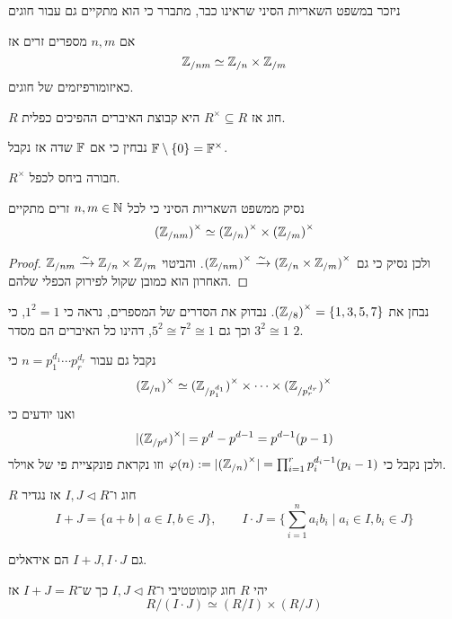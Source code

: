 ניזכר במשפט השאריות הסיני שראינו כבר, מתברר כי הוא מתקיים גם עבור חוגים
\begin{theorem}
	אם $n, m$ מספרים זרים אז
	\[
		\mathbb{Z}_{/nm} \simeq \mathbb{Z}_{/n} \times \mathbb{Z}_{/m}
	\]
	כאיזומורפיזמים של חוגים.
\end{theorem}
\begin{definition}
	$R$ חוג אז $R^\times \subseteq R$ היא קבוצת האיברים ההפיכים כפלית.
\end{definition}
נבחין כי אם $\mathbb{F}$ שדה אז נקבל $\mathbb{F} \setminus \{ 0 \} = \mathbb{F}^\times$.
\begin{proposition}
	$R^\times$ חבורה ביחס לכפל.
\end{proposition}
\begin{conclusion}
	נסיק ממשפט השאריות הסיני כי לכל $n, m \in \mathbb{N}$ זרים מתקיים
	\[
		{(\mathbb{Z}_{/nm})}^\times \simeq {(\mathbb{Z}_{/n})}^\times \times {(\mathbb{Z}_{/m})}^\times
	\]
\end{conclusion}
\begin{proof}
	$\mathbb{Z}_{/nm} \xrightarrow{\sim} \mathbb{Z}_{/n} \times \mathbb{Z}_{/m}$
	ולכן נסיק כי גם ${(\mathbb{Z}_{/nm})}^\times \xrightarrow{\sim} {(\mathbb{Z}_{/n} \times \mathbb{Z}_{/m})}^\times$.
	והביטוי האחרון הוא כמובן שקול לפירוק הכפלי שלהם.
\end{proof}
\begin{example}
	נבחן את ${(\mathbb{Z}_{/8})}^\times = \{ 1, 3, 5, 7 \}$.
	נבדוק את הסדרים של המספרים, נראה כי $1^2 = 1$, כי $3^2 \cong 1$ וכך גם $5^2 \cong 7^2 \cong 1$, דהינו כל האיברים הם מסדר $2$.
\end{example}
\begin{example}
	נקבל גם עבור $n = p_1^{d_1} \cdots p_r^{d_r}$ כי
	\[
		{(\mathbb{Z}_{/n})}^\times \simeq {(\mathbb{Z}_{/p_1^{d_1}})}^\times \times \cdots \times {(\mathbb{Z}_{/p_r^{d_r}})}^\times 
	\]
	ואנו יודעים כי
	\[
		|{(\mathbb{Z}_{/p^{d}})}^\times| = p^d - p^{d - 1} = p^{d - 1}(p - 1)
	\]
	ולכן נקבל כי $\varphi(n) := |{(\mathbb{Z}_{/n})}^\times| = \prod_{i = 1}^r p_i^{d_i - 1} (p_i - 1)$ וזו נקראת פונקציית פי של אוילר.
\end{example}
\begin{definition}
	$R$ חוג ו־$I, J \triangleleft R$ אז נגדיר
	\[
		I + J = \{ a + b \mid a \in I, b \in J \},
		\qquad
		I \cdot J = \{ \sum_{i = 1}^{n} a_i b_i \mid a_i \in I, b_i \in J \}
	\]
\end{definition}
\begin{proposition}
	גם $I + J, I \cdot J$ הם אידאלים.
\end{proposition}
\begin{theorem}
	יהי $R$ חוג קומוטטיבי ו־$I, J \triangleleft R$ כך ש־$I + J = R$ אז
	\[
		R / (I \cdot J) \simeq (R / I) \times (R / J)
	\]
\end{theorem}
